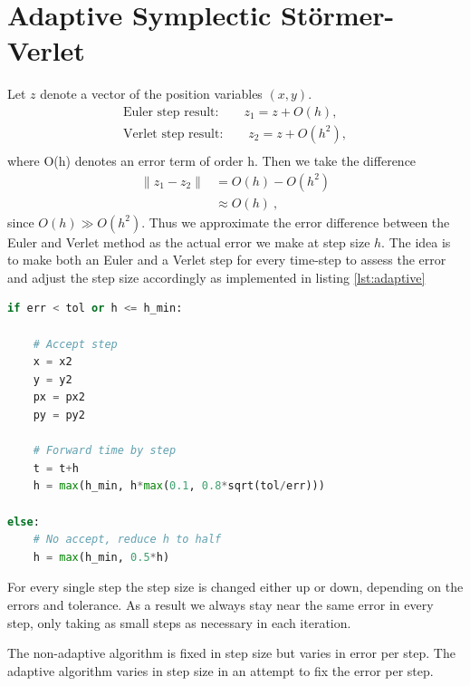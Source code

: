 \section{Adaptive Symplectic Störmer-Verlet}
Let $z$ denote a vector of the position variables $(x,y)$.
\begin{align}
\text{Euler step result:} \qquad z_1 = z + O(h), \\
\text{Verlet step result:} \qquad z_2 = z + O(h^2), \\
\end{align}
where O(h) denotes an error term of order h. Then we take the difference
\begin{align}
\|z_1 - z_2\| &= O(h) - O(h^2) \\
&\approx O(h)\ ,
\end{align}
since $O(h) \gg O(h^2)$. Thus we approximate the error difference between the Euler and Verlet method as the actual error we make at step size $h$. The idea is to make both an Euler and a Verlet step for every time-step to assess the error and adjust the step size accordingly as implemented in listing \ref{lst:adaptive}
\begin{adjustwidth*}{0cm}{-0.4cm}
\begin{lstlisting}[language=Python,caption=Adaptive method implemented in python. We accept the Verlet step only if the error is no more than a given tolerance \texttt{tol}. Subsequently we estimate a new \texttt{h} that will yield an error of \texttt{tol} in the next step and use \texttt{0.8} of this value to avoid frequent rejects. If the step is rejected we reduce the step size by half,label=lst:adaptive]
if err < tol or h <= h_min:

    # Accept step
    x = x2
    y = y2
    px = px2
    py = py2

    # Forward time by step
    t = t+h
    h = max(h_min, h*max(0.1, 0.8*sqrt(tol/err)))

else:
    # No accept, reduce h to half
    h = max(h_min, 0.5*h)
\end{lstlisting}
\end{adjustwidth*}
For every single step the step size is changed either up or down, depending on the errors and tolerance. As a result we always stay near the same error in every step, only taking as small steps as necessary in each iteration.

The non-adaptive algorithm is fixed in step size but varies in error per step.
The adaptive algorithm varies in step size in an attempt to fix the error per step.


